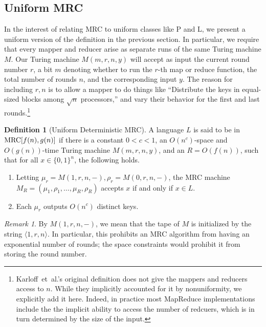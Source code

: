 \documentclass[11pt]{article}
\theoremstyle{definition}
\newtheorem{defn}{Definition}
\theoremstyle{remark}
\newtheorem{remark}{Remark}
\newcommand{\mrc}{\textup{MRC}}
\begin{document}
\subsection{Uniform MRC}\label{sec:uniform}

In the interest of relating MRC to uniform classes like P and L, we present a
uniform version of the definition in the previous section. In particular, we
require that every mapper and reducer arise as separate runs of the same Turing
machine $M$. Our Turing machine $M(m, r, n, y)$ will accept as input the
current round number $r$, a bit $m$ denoting whether to run the $r$-th map or
reduce function, the total number of rounds $n$, and the corresponding input
$y$. The reason for including $r, n$ is to allow a mapper to do things like
``Distribute the keys in equal-sized blocks among $\sqrt{n}$ processors,'' and
vary their behavior for the first and last rounds.\footnote{Karloff~et~al.'s
original definition does not give the mappers and reducers access to $n$. While
they implicitly accounted for it by nonuniformity, we explicitly add it here.
Indeed, in practice most MapReduce implementations include the the implicit
ability to access the number of redcuers, which is in turn determined by the
size of the input.}

\begin{defn}[Uniform Deterministic MRC]

A language $L$ is said to be in $\mrc[f(n),g(n)]$ if there is a constant $0 < c
< 1$, an $O(n^c)$-space and $O(g(n))$-time Turing machine $M(m, r, n, y)$, and
an $R = O(f(n))$, such that for all $x \in \{ 0,1 \}^n$, the following holds.  

\begin{enumerate}
\item Letting $\mu_r = M(1, r, n, -), \rho_r = M(0, r, n, -)$, the MRC machine
$M_R = (\mu_1, \rho_1, \dots, \mu_R, \rho_R)$ accepts $x$ if and only if $x \in
L$. 

\item Each $\mu_r$ outputs $O(n^c)$ distinct keys. 
\end{enumerate}

\end{defn}

\begin{remark}
By $M(1, r, n, -)$, we mean that the tape of $M$ is initialized by the string
$\langle 1, r, n \rangle$. In particular, this prohibits an MRC algorithm from
having an exponential number of rounds; the space constraints would prohibit it
from storing the round number.
\end{remark}
\end{document}
